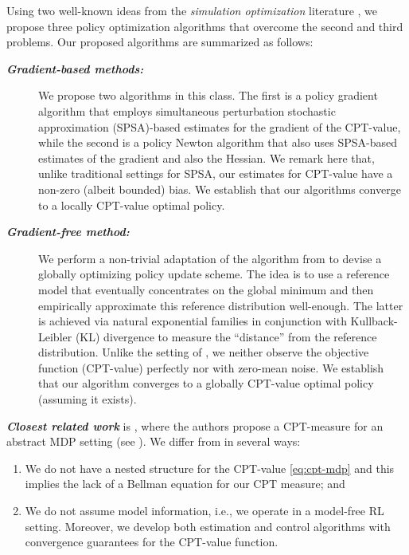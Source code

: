 \documentclass[11pt,letterpaper,english]{article}
\begin{document}
Using two well-known ideas from the \textit{simulation optimization} literature \cite{fu2015handbook}, we propose three policy optimization algorithms that overcome the second and third problems. Our proposed algorithms are summarized as follows:
\begin{description}
\item[\textbf{\textit{Gradient-based methods:}}] We propose two algorithms in this class. The first is a policy gradient algorithm that employs simultaneous perturbation stochastic approximation (SPSA)-based estimates for the gradient of the CPT-value, while the second is a policy Newton algorithm that also uses SPSA-based estimates of the gradient and also the Hessian. We remark here that, unlike traditional settings for SPSA, our estimates for CPT-value have a non-zero (albeit bounded) bias. We establish that our algorithms converge to a locally CPT-value optimal policy. 
\item[\textbf{\textit{Gradient-free method:}}] We perform a non-trivial adaptation of the algorithm from \cite{chang2013simulation} to devise a globally optimizing policy update scheme. The idea is to use a reference model that eventually concentrates on the global minimum and then empirically approximate this reference distribution well-enough. The latter is achieved via natural exponential families in conjunction with Kullback-Leibler (KL) divergence to measure the ``distance'' from the reference distribution. Unlike the setting of \cite{chang2013simulation}, we neither observe the objective function (CPT-value) perfectly nor with zero-mean noise. We establish that our algorithm converges to a globally CPT-value optimal policy (assuming it exists).
\end{description}


\noindent
\textit{\textbf{Closest related work}} is \cite{lin2013stochastic}, where the authors propose a CPT-measure for an abstract MDP setting (see \cite{bertsekas2013abstract}). We differ from \cite{lin2013stochastic} in several ways:
\begin{enumerate}[\bfseries (i)]
\item We do not have a nested structure for the CPT-value \eqref{eq:cpt-mdp} and this implies the lack of a Bellman equation for our CPT measure; and
\item We do not assume model information, i.e., we operate in a model-free RL setting. Moreover, we develop both estimation and control algorithms with convergence guarantees for the CPT-value function.
\end{enumerate}
\end{document}

